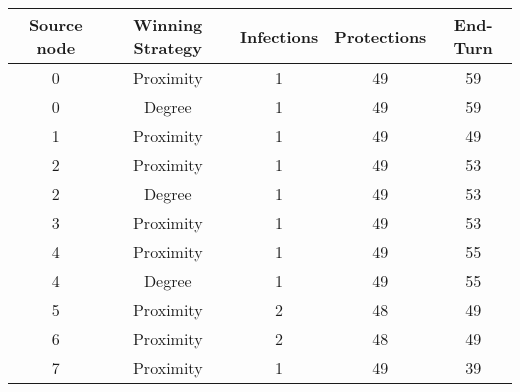 \documentclass[results.tex]{subfiles}
\begin{document}
    \begin{center}
        \begin{tabular}{| c || c | c | c | c |}
            \hline
            {\bfseries Source node} & {\bfseries Winning Strategy} & {\bfseries Infections} & {\bfseries Protections}
            & {\bfseries End-Turn}
            \\  %
            \hline\hline
            0                       & Proximity                    & 1                      & 49                      & 59                   \\
            \hline
            0                       & Degree                       & 1                      & 49                      & 59                   \\
            \hline
            1                       & Proximity                    & 1                      & 49                      & 49                   \\
            \hline
            2                       & Proximity                    & 1                      & 49                      & 53                   \\
            \hline
            2                       & Degree                       & 1                      & 49                      & 53                   \\
            \hline
            3                       & Proximity                    & 1                      & 49                      & 53                   \\
            \hline
            4                       & Proximity                    & 1                      & 49                      & 55                   \\
            \hline
            4                       & Degree                       & 1                      & 49                      & 55                   \\
            \hline
            5                       & Proximity                    & 2                      & 48                      & 49                   \\
            \hline
            6                       & Proximity                    & 2                      & 48                      & 49                   \\
            \hline
            7                       & Proximity                    & 1                      & 49                      & 39                   \\

\end{tabular}
\end{center}
\end{document}
